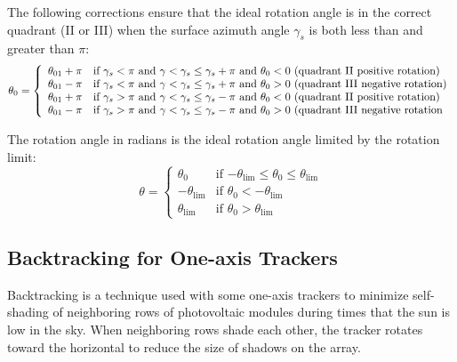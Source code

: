 \documentclass[12pt,letterpaper]{article}
\begin{document}
The following corrections ensure that the ideal rotation angle is in the correct quadrant (II or III) when the surface azimuth angle $\gamma_s$ is both less than and greater than $\pi$:
\begin{equation}
\theta_0 = \left\{
\begin{array}{ll}
\theta_{\mathrm{01}} + \pi & \text{if $\gamma_s < \pi$ and $\gamma < \gamma_s \leq \gamma_s + \pi$ and $\theta_0 < 0$ (quadrant II positive rotation)} \notag\\
\theta_{\mathrm{01}} - \pi & \text{if $\gamma_s < \pi$ and $\gamma < \gamma_s \leq \gamma_s + \pi$ and $\theta_0 > 0$ (quadrant III negative rotation)} \notag\\
\theta_{\mathrm{01}} + \pi & \text{if $\gamma_s > \pi$ and $\gamma < \gamma_s \leq \gamma_s - \pi$ and $\theta_0 < 0$ (quadrant II positive rotation)} \notag\\
\theta_{\mathrm{01}} - \pi & \text{if $\gamma_s > \pi$ and $\gamma < \gamma_s \leq \gamma_s - \pi$ and $\theta_0 > 0$ (quadrant III negative rotation}
\end{array}
\right.
\end{equation}

The rotation angle in radians is the ideal rotation angle limited by the rotation limit:
\begin{equation}\label{eqn-rot1x}
\theta = \left\{
\begin{array}{ll}
\theta_0 & \text{if $-\theta_{\mathrm{lim}} \leq \theta_0 \leq \theta_{\mathrm{lim}}$}\\
-\theta_{\mathrm{lim}} & \text{if $\theta_0 < -\theta_{\mathrm{lim}}$}\\
\theta_{\mathrm{lim}} &  \text{if $\theta_0 > \theta_{\mathrm{lim}}$}
\end{array}
\right.
\end{equation}

\subsection{Backtracking for One-axis Trackers}\label{sec-backtrack1x}

Backtracking is a technique used with some one-axis trackers to minimize self-shading of neighboring rows of photovoltaic modules during times that the sun is low in the sky. When neighboring rows shade each other, the tracker rotates toward the horizontal to reduce the size of shadows on the array.
\end{document}
